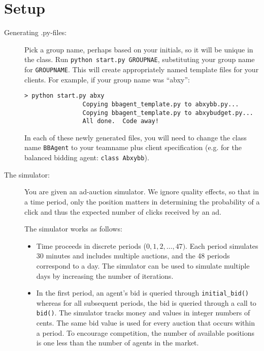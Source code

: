 \documentclass[11pt]{article}
\begin{document}
\section{Setup}
	\begin{description}

		\item[Generating .py-files:] Pick a group name, perhaps based on your initials, so it will be unique in the class. Run \verb+python start.py GROUPNAE+, substituting your group name for \verb+GROUPNAME+. This will create appropriately named template files for your clients. For example, if your group name was ``abxy'':
			\begin{verbatim}> python start.py abxy
				Copying bbagent_template.py to abxybb.py...
				Copying bbagent_template.py to abxybudget.py...
				All done.  Code away!
			\end{verbatim}
			In each of these newly generated files, you will need to change the class name \verb+BBAgent+  to your teamname plus client specification (e.g. for the balanced bidding agent: \verb+class Abxybb+).
	
                      \item[The simulator:] You are given an
                        ad-auction simulator.  We ignore quality
                        effects, so that in a time period, only the
                        position matters in determining the
                        probability of a click and thus the expected
                        number of clicks received by an ad.

The simulator works as follows:
%
			\begin{itemize}
				\item Time proceeds in discrete periods ($0, 1, 2, \ldots, 47)$. Each period simulates 30 minutes and includes multiple auctions,
and the 48 periods correspond to a day. The simulator can be used to simulate
multiple days by increasing the number of iterations.

				\item In the first period, an agent's
                                  bid is queried through
                                  \verb+initial_bid()+ whereas for all
                                  subsequent periods, the bid is
                                  queried through a call to
                                  \verb+bid()+. The simulator tracks
                                  money and values in integer numbers
                                  of cents.
The same bid value is used for every auction that
occurs within a period.
To encourage competition, the number of available positions is one less than
the number of agents in the market.


\end{itemize}
\end{description}
\end{document}
